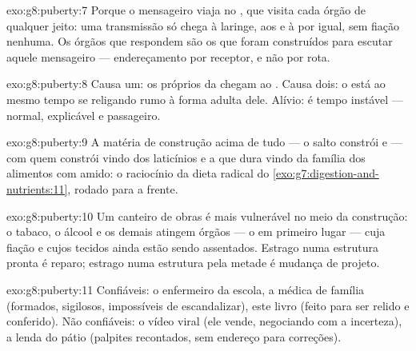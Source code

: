 \begin{solution}{exo:g8:puberty:7}
Porque o mensageiro viaja no , que visita cada órgão de qualquer
jeito: uma transmissão só chega à laringe, aos  e à  por
igual, sem fiação nenhuma. Os órgãos que respondem são os que foram
construídos para escutar aquele mensageiro --- endereçamento por
receptor, e não por rota.
\end{solution}

\begin{solution}{exo:g8:puberty:8}
Causa um: os próprios  da  chegam ao . Causa
dois: o  está ao mesmo tempo se religando rumo à forma adulta
dele. Alívio: é tempo instável --- normal, explicável e passageiro.
\end{solution}

\begin{solution}{exo:g8:puberty:9}
A matéria de construção acima de tudo --- o salto constrói  e
 --- com quem constrói  vindo dos laticínios e a  que
dura vindo da família dos alimentos com amido: o raciocínio da dieta
radical do \cref{exo:g7:digestion-and-nutrients:11}, rodado para a
frente.
\end{solution}

\begin{solution}{exo:g8:puberty:10}
Um canteiro de obras é mais vulnerável no meio da construção: o
tabaco, o álcool e os demais atingem órgãos --- o  em primeiro
lugar --- cuja fiação e cujos tecidos ainda estão sendo assentados.
Estrago numa estrutura pronta é reparo; estrago numa estrutura pela
metade é mudança de projeto.
\end{solution}

\begin{solution}{exo:g8:puberty:11}
Confiáveis: o enfermeiro da escola, a médica de família (formados,
sigilosos, impossíveis de escandalizar), este livro (feito para ser
relido e conferido). Não confiáveis: o vídeo viral (ele vende,
negociando com a incerteza), a lenda do pátio (palpites recontados,
sem endereço para correções).
\end{solution}

